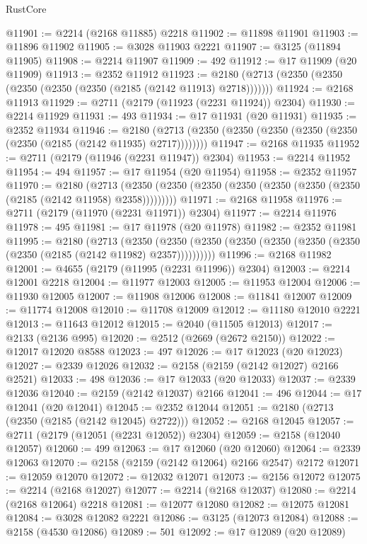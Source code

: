\begin{lexlean}{RustCore}
\begin{coremodule}
@11901 := @2214 (@2168 @11885) @2218
@11902 := @11898 @11901
@11903 := @11896 @11902
@11905 := @3028 @11903 @2221
@11907 := @3125 (@11894 @11905)
@11908 := @2214 @11907
@11909 := 492
@11912 := @17 @11909 (@20 @11909)
@11913 := @2352 @11912
@11923 := @2180 (@2713 (@2350 (@2350 (@2350 (@2350 (@2350 (@2185 (@2142 @11913) @2718)))))))
@11924 := @2168 @11913
@11929 := @2711 (@2179 (@11923 (@2231 @11924)) @2304)
@11930 := @2214 @11929
@11931 := 493
@11934 := @17 @11931 (@20 @11931)
@11935 := @2352 @11934
@11946 := @2180 (@2713 (@2350 (@2350 (@2350 (@2350 (@2350 (@2350 (@2185 (@2142 @11935) @2717))))))))
@11947 := @2168 @11935
@11952 := @2711 (@2179 (@11946 (@2231 @11947)) @2304)
@11953 := @2214 @11952
@11954 := 494
@11957 := @17 @11954 (@20 @11954)
@11958 := @2352 @11957
@11970 := @2180
    (@2713 (@2350 (@2350 (@2350 (@2350 (@2350 (@2350 (@2350 (@2185 (@2142 @11958) @2358)))))))))
@11971 := @2168 @11958
@11976 := @2711 (@2179 (@11970 (@2231 @11971)) @2304)
@11977 := @2214 @11976
@11978 := 495
@11981 := @17 @11978 (@20 @11978)
@11982 := @2352 @11981
@11995 := @2180
    (@2713
      (@2350 (@2350 (@2350 (@2350 (@2350 (@2350 (@2350 (@2350 (@2185 (@2142 @11982) @2357))))))))))
@11996 := @2168 @11982
@12001 := @4655 (@2179 (@11995 (@2231 @11996)) @2304)
@12003 := @2214 @12001 @2218
@12004 := @11977 @12003
@12005 := @11953 @12004
@12006 := @11930 @12005
@12007 := @11908 @12006
@12008 := @11841 @12007
@12009 := @11774 @12008
@12010 := @11708 @12009
@12012 := @11180 @12010 @2221
@12013 := @11643 @12012
@12015 := @2040 (@11505 @12013)
@12017 := @2133 (@2136 @995)
@12020 := @2512 (@2669 (@2672 @2150))
@12022 := @12017 @12020 @8588
@12023 := 497
@12026 := @17 @12023 (@20 @12023)
@12027 := @2339 @12026
@12032 := @2158 (@2159 (@2142 @12027) @2166 @2521)
@12033 := 498
@12036 := @17 @12033 (@20 @12033)
@12037 := @2339 @12036
@12040 := @2159 (@2142 @12037) @2166
@12041 := 496
@12044 := @17 @12041 (@20 @12041)
@12045 := @2352 @12044
@12051 := @2180 (@2713 (@2350 (@2185 (@2142 @12045) @2722)))
@12052 := @2168 @12045
@12057 := @2711 (@2179 (@12051 (@2231 @12052)) @2304)
@12059 := @2158 (@12040 @12057)
@12060 := 499
@12063 := @17 @12060 (@20 @12060)
@12064 := @2339 @12063
@12070 := @2158 (@2159 (@2142 @12064) @2166 @2547) @2172
@12071 := @12059 @12070
@12072 := @12032 @12071
@12073 := @2156 @12072
@12075 := @2214 (@2168 @12027)
@12077 := @2214 (@2168 @12037)
@12080 := @2214 (@2168 @12064) @2218
@12081 := @12077 @12080
@12082 := @12075 @12081
@12084 := @3028 @12082 @2221
@12086 := @3125 (@12073 @12084)
@12088 := @2158 (@4530 @12086)
@12089 := 501
@12092 := @17 @12089 (@20 @12089)

\end{coremodule}
\end{lexlean}
